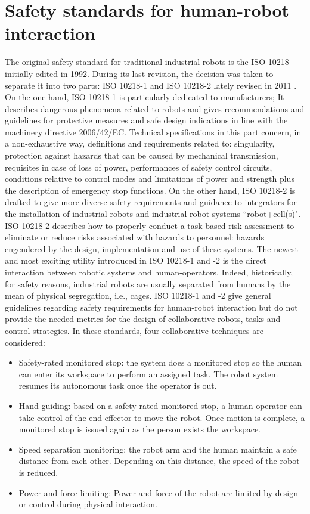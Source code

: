 \section[Safety standards]{Safety standards for human-robot interaction}
The original safety standard for traditional industrial robots is the ISO 10218 initially edited in 1992. During its last revision, the decision was taken to separate it into two parts: ISO 10218-1 and ISO 10218-2 lately revised in 2011 \cite{fryman2014updating}. On the one hand,  ISO 10218-1 \cite{ISO10218PDF1} is particularly dedicated to manufacturers; It describes dangerous phenomena related to robots and gives recommendations and guidelines for protective measures and safe design indications in line with the machinery directive 2006/42/EC. 
Technical specifications in this part concern, in a non-exhaustive way, definitions and requirements related to: singularity, protection against hazards that can be caused by mechanical transmission, requisites in case of loss of power, performances of safety control circuits, conditions relative to control modes and limitations of power and strength plus the description of emergency stop functions.
On the other hand, ISO 10218-2 is drafted to give more diverse safety requirements and guidance to integrators for the installation of industrial robots and industrial robot systems ``robot+cell(s)". ISO 10218-2 \cite{ISO10218PDF2} describes how to properly conduct a task-based risk assessment to eliminate or reduce risks associated with hazards to personnel: hazards engendered by the design, implementation and use of these systems. The newest and most exciting utility introduced in ISO 10218-1 and -2 is the direct interaction between robotic systems and human-operators. Indeed, historically, for safety reasons, industrial robots are usually separated from humans by the mean of physical segregation, i.e., cages. ISO 10218-1 and -2 give general guidelines regarding safety requirements for human-robot interaction but do not provide the needed metrics for the design of collaborative robots, tasks and control strategies. In these standards, four collaborative techniques are considered:
\begin{itemize}
\item Safety-rated monitored stop: the system does a monitored stop so the human can enter its workspace to perform an assigned task. The robot system resumes its autonomous task once the operator is out.
\item Hand-guiding: based on a safety-rated monitored stop, a human-operator can take control of the end-effector to move the robot. Once motion is complete, a monitored stop is issued again as the person exists the workspace.
\item Speed separation monitoring: the robot arm and the human maintain a safe distance from each other. Depending on this distance, the speed of the robot is reduced.
\item Power and force limiting: Power and force of the robot are limited by design or control during physical interaction.
\end{itemize}
